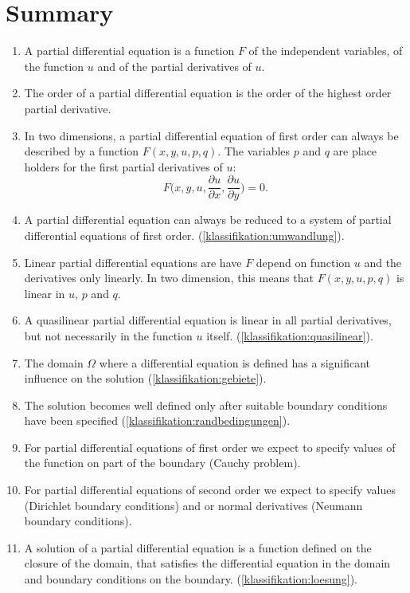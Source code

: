 \section{Summary}
\begin{enumerate}
\item
A partial differential equation is a function $F$ of the independent
variables, of the function $u$ and of the partial derivatives of $u$.
\item
The order of a partial differential equation is the order of the
highest order partial derivative.
\item
In two dimensions, a partial differential equation of first order can
always be described by a function $F(x,y,u,p,q)$.
The variables $p$ and $q$ are place holders for the first partial
derivatives of $u$:
\[
F\biggl(
x,y, u,
\frac{\partial u}{\partial x},
\frac{\partial u}{\partial y}
\biggr)=0.
\]
\item
A partial differential equation can always be reduced to a system
of partial differential equations of first order.
(\ref{klassifikation:umwandlung}).
\item
Linear partial differential equations are have $F$ depend on function 
$u$ and the derivatives only linearly.
In two dimension, this means that $F(x,y,u,p,q)$ is linear in
$u$, $p$ and $q$.
\item
A quasilinear partial differential equation is linear in all
partial derivatives, but not necessarily in the function $u$ itself.
(\ref{klassifikation:quasilinear}).
\item
The domain $\Omega$ where a differential equation is defined
has a significant influence on the solution
(\ref{klassifikation:gebiete}).
\item
The solution becomes well defined only after suitable boundary conditions
have been specified
(\ref{klassifikation:randbedingungen}). 
\item
For partial differential equations of first order we expect to specify
values of the function on part of the boundary (Cauchy problem).
\item
For partial differential equations of second order we expect to
specify values (Dirichlet boundary conditions)
and or normal derivatives (Neumann boundary conditions).
\item
A solution of a partial differential equation is a function defined
on the closure of the domain, that satisfies the differential equation
in the domain and boundary conditions on the boundary.
(\ref{klassifikation:loesung}).
\end{enumerate}
